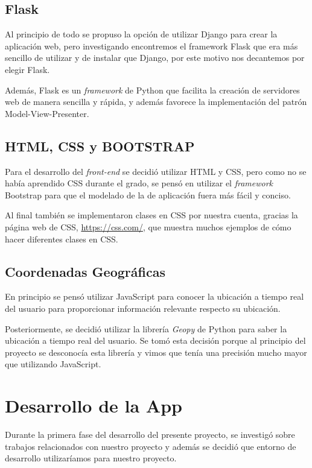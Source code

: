 \subsection{Flask}

Al principio de todo se propuso la opción de utilizar Django \cite{Django} para crear la aplicación web, pero investigando encontremos el framework Flask \cite{Flask} que era más sencillo de utilizar y de instalar que Django, por este motivo nos decantemos por elegir Flask. 

Además, Flask es un \textit{framework} de Python que facilita la creación de servidores web de manera sencilla y rápida, y además favorece la implementación del patrón Model-View-Presenter.

\subsection{HTML, CSS y BOOTSTRAP}

Para el desarrollo del \textit{front-end} se decidió utilizar  HTML y CSS, pero como no se había aprendido CSS durante el grado, se pensó en utilizar el \textit{framework} Bootstrap para que el modelado de la de aplicación fuera más fácil y conciso.

Al final también se implementaron clases en CSS por nuestra cuenta, gracias la página web de CSS, \url{https://css.com/}, que muestra muchos ejemplos de cómo hacer diferentes clases en CSS.

\subsection{Coordenadas Geográficas}

En principio se pensó utilizar JavaScript para conocer la ubicación a tiempo real del usuario para proporcionar información relevante respecto su ubicación.

Posteriormente, se decidió utilizar la librería \textit{Geopy} de Python para saber la ubicación a tiempo real del usuario. Se tomó esta decisión porque al principio del proyecto se desconocía esta librería y vimos que tenía una precisión mucho mayor que utilizando JavaScript.

\section{Desarrollo de la App}
Durante la primera fase del desarrollo del presente proyecto, se investigó sobre trabajos relacionados con nuestro proyecto y además se decidió que entorno de desarrollo utilizaríamos para nuestro proyecto.


